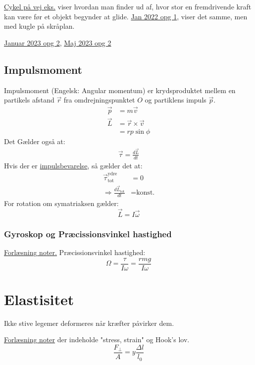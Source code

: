 \documentclass[a4paper,oneside,article]{memoir}
\begin{document}
\hyperref[asc:Rul uden glid]{Cykel på vej eks.} viser hvordan man finder ud af, hvor stor en fremdrivende kraft kan være før et objekt begynder at glide. \hyperref[asc:Jan 2022 opg 1]{Jan 2022 opg 1}, viser det samme, men med kugle på skråplan. 

\hyperref[asc:Januar 2023 opg 2]{Januar 2023 opg 2}, \hyperref[asc:Maj 2023 opg 2]{Maj 2023 opg 2}

\subsection{Impulsmoment} \label{ssc:impulsmoment}
Impulsmoment (Engelsk: Angular momentum) er krydsproduktet mellem en partikels afstand $\Vec{r}$ fra omdrejningspunktet $O$ og partiklens impuls $\Vec{p}$. 
\begin{align*}
    \Vec{p} &= m\Vec{v} \\
    \Vec{L} &= \Vec{r}\times\Vec{v}\\
    &= rp\sin{\phi}
\end{align*}
Det Gælder også at: 
\begin{align*}
    \Vec{\tau} = \frac{d\Vec{L}}{dt}
\end{align*}
Hvis der er \hyperref[scc:impulsbevarelse]{impulsbevarelse}, så gælder det at: 
\begin{align*}
    \Vec{\tau}_\text{tot}^\text{ydre} &= 0 \\
    \Rightarrow \frac{d\Vec{L}_\text{tot}}{dt} &= \text{konst.}
\end{align*}
For rotation om symatriaksen gælder: \[\Vec{L}=I\Vec{\omega}\]

\subsubsection{Gyroskop og Præcissionsvinkel hastighed} \label{sssc:gyroskop}
\hyperref[asc:Gyroskop og præcissionsvinkelhastighed]{Forlæsning noter.}
Præcissionsvinkel hastighed: \[\Omega=\frac{\tau}{I\omega}=\frac{rmg}{I\omega}\]

\section{Elastisitet} \label{sc:elastisitet}
Ikke stive legemer deformeres når kræfter påvirker dem. 

\hyperref[asc:elastisitet]{Forlæsning noter} der indeholde "stress, strain" og Hook's lov. \[\frac{F_\perp}{A}=y\frac{\Delta l}{l_0}\]
\end{document}

